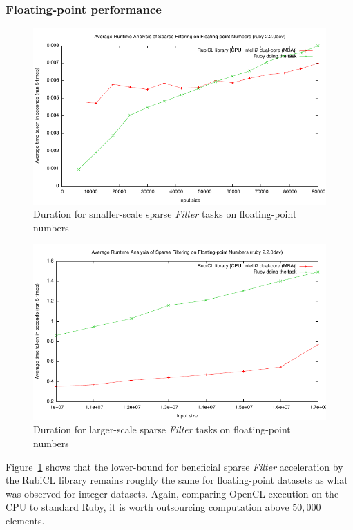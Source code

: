 \subsubsection{Floating-point performance}
\begin{figure}
  \includegraphics[width=\textwidth]{./graphing/dsparsesmall.pdf}
  \caption{Duration for smaller-scale sparse \emph{Filter} tasks on floating-point numbers}
  \label{fig:dsdf_task_smallrun}
\end{figure}

\begin{figure}
  \includegraphics[width=\textwidth]{./graphing/dsfilterlots.pdf}
  \caption{Duration for larger-scale sparse \emph{Filter} tasks on floating-point numbers}
  \label{fig:dsdf_task_bigrun}
\end{figure}

Figure~\ref{fig:dsdf_task_smallrun} shows that the lower-bound for beneficial sparse \emph{Filter} acceleration by the RubiCL library remains roughly the same for floating-point datasets as what was observed for integer datasets. Again, comparing \ac{OpenCL} execution on the \ac{CPU} to standard Ruby, it is worth outsourcing computation above $50,000$ elements.

